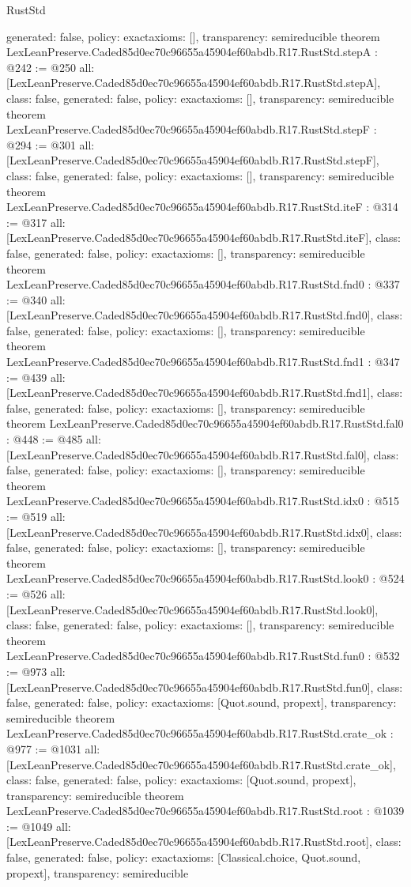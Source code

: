 \begin{lexlean}{RustStd}
\begin{coremodule}
{  generated: false,
  policy: exact{axioms: []},
  transparency: semireducible
}
theorem LexLeanPreserve.Caded85d0ec70c96655a45904ef60abdb.R17.RustStd.stepA : @242 := @250 {
  all: [LexLeanPreserve.Caded85d0ec70c96655a45904ef60abdb.R17.RustStd.stepA],
  class: false,
  generated: false,
  policy: exact{axioms: []},
  transparency: semireducible
}
theorem LexLeanPreserve.Caded85d0ec70c96655a45904ef60abdb.R17.RustStd.stepF : @294 := @301 {
  all: [LexLeanPreserve.Caded85d0ec70c96655a45904ef60abdb.R17.RustStd.stepF],
  class: false,
  generated: false,
  policy: exact{axioms: []},
  transparency: semireducible
}
theorem LexLeanPreserve.Caded85d0ec70c96655a45904ef60abdb.R17.RustStd.iteF : @314 := @317 {
  all: [LexLeanPreserve.Caded85d0ec70c96655a45904ef60abdb.R17.RustStd.iteF],
  class: false,
  generated: false,
  policy: exact{axioms: []},
  transparency: semireducible
}
theorem LexLeanPreserve.Caded85d0ec70c96655a45904ef60abdb.R17.RustStd.fnd0 : @337 := @340 {
  all: [LexLeanPreserve.Caded85d0ec70c96655a45904ef60abdb.R17.RustStd.fnd0],
  class: false,
  generated: false,
  policy: exact{axioms: []},
  transparency: semireducible
}
theorem LexLeanPreserve.Caded85d0ec70c96655a45904ef60abdb.R17.RustStd.fnd1 : @347 := @439 {
  all: [LexLeanPreserve.Caded85d0ec70c96655a45904ef60abdb.R17.RustStd.fnd1],
  class: false,
  generated: false,
  policy: exact{axioms: []},
  transparency: semireducible
}
theorem LexLeanPreserve.Caded85d0ec70c96655a45904ef60abdb.R17.RustStd.fal0 : @448 := @485 {
  all: [LexLeanPreserve.Caded85d0ec70c96655a45904ef60abdb.R17.RustStd.fal0],
  class: false,
  generated: false,
  policy: exact{axioms: []},
  transparency: semireducible
}
theorem LexLeanPreserve.Caded85d0ec70c96655a45904ef60abdb.R17.RustStd.idx0 : @515 := @519 {
  all: [LexLeanPreserve.Caded85d0ec70c96655a45904ef60abdb.R17.RustStd.idx0],
  class: false,
  generated: false,
  policy: exact{axioms: []},
  transparency: semireducible
}
theorem LexLeanPreserve.Caded85d0ec70c96655a45904ef60abdb.R17.RustStd.look0 : @524 := @526 {
  all: [LexLeanPreserve.Caded85d0ec70c96655a45904ef60abdb.R17.RustStd.look0],
  class: false,
  generated: false,
  policy: exact{axioms: []},
  transparency: semireducible
}
theorem LexLeanPreserve.Caded85d0ec70c96655a45904ef60abdb.R17.RustStd.fun0 : @532 := @973 {
  all: [LexLeanPreserve.Caded85d0ec70c96655a45904ef60abdb.R17.RustStd.fun0],
  class: false,
  generated: false,
  policy: exact{axioms: [Quot.sound, propext]},
  transparency: semireducible
}
theorem LexLeanPreserve.Caded85d0ec70c96655a45904ef60abdb.R17.RustStd.crate_ok : @977 := @1031 {
  all: [LexLeanPreserve.Caded85d0ec70c96655a45904ef60abdb.R17.RustStd.crate_ok],
  class: false,
  generated: false,
  policy: exact{axioms: [Quot.sound, propext]},
  transparency: semireducible
}
theorem LexLeanPreserve.Caded85d0ec70c96655a45904ef60abdb.R17.RustStd.root : @1039 := @1049 {
  all: [LexLeanPreserve.Caded85d0ec70c96655a45904ef60abdb.R17.RustStd.root],
  class: false,
  generated: false,
  policy: exact{axioms: [Classical.choice, Quot.sound, propext]},
  transparency: semireducible
}


\end{coremodule}
\end{lexlean}
